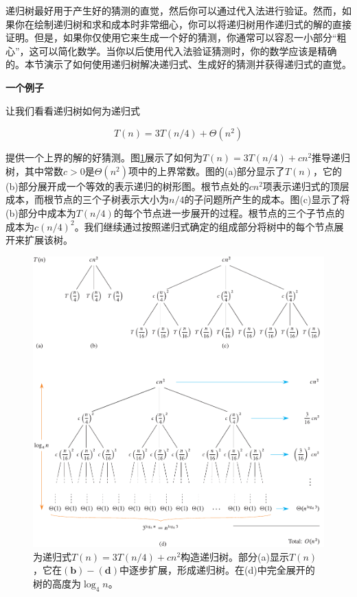 \documentclass[lang=cn,newtx,10pt,scheme=chinese]{elegantbook}
\begin{document}
递归树最好用于产生好的猜测的直觉，然后你可以通过代入法进行验证。然而，如果你在绘制递归树和求和成本时非常细心，你可以将递归树用作递归式的解的直接证明。但是，如果你仅使用它来生成一个好的猜测，你通常可以容忍一小部分“粗心”，这可以简化数学。当你以后使用代入法验证猜测时，你的数学应该是精确的。本节演示了如何使用递归树解决递归式、生成好的猜测并获得递归式的直觉。

\textbf{一个例子}

让我们看看递归树如何为递归式

\begin{equation}
T(n)=3 T(n / 4)+\Theta\left(n^2\right)
\end{equation}

提供一个上界的解的好猜测。图\ref{fig:4-1}展示了如何为$T(n)=3 T(n / 4)+c n^2$推导递归树，其中常数$c>0$是$\Theta\left(n^2\right)$项中的上界常数。图的(a)部分显示了$T(n)$，它的(b)部分展开成一个等效的表示递归的树形图。根节点处的$c n^2$项表示递归式的顶层成本，而根节点的三个子树表示大小为$n / 4$的子问题所产生的成本。图(c)显示了将(b)部分中成本为$T(n / 4)$的每个节点进一步展开的过程。根节点的三个子节点的成本为$c(n / 4)^2$。我们继续通过按照递归式确定的组成部分将树中的每个节点展开来扩展该树。

\begin{figure}[htbp]
    \centering
    \includegraphics{算法导论第四版插图/第四章/4-1.pdf}
    \caption{为递归式$T(n)=3 T(n/4)+cn^2$构造递归树。部分(a)显示$T(n)$，它在$(\mathbf{b})-(\mathbf{d})$中逐步扩展，形成递归树。在(d)中完全展开的树的高度为$\log_4 n$。}
    \label{fig:4-1}
\end{figure}
\end{document}
